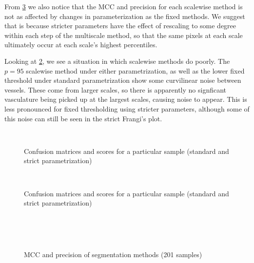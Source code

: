 From \cref{fig:scoring-boxplots} we also notice that the MCC and precision for each scalewise method is not as affected by changes in parameterization as the fixed methods. We suggest that is because stricter parameters have the effect of rescaling to some degree within each step of the multiscale method, so that the same pixels at each scale ultimately occur at each scale's highest percentiles.

Looking at \cref{fig:seg-montage-example2}, we see a situation in which scalewise methods do poorly. The $p=95$ scalewise method under either parametrization, as well as the lower fixed threshold under standard parametrization show some curvilinear noise between vessels. These come from larger scales, so there is apparently no signficant vasculature being picked up at the largest scales, causing noise to appear. This is less pronounced for fixed thresholding using stricter parameters, although some of this noise can still be seen in the strict Frangi's \Vmax plot.




\begin{figure}[p] \centering
   \\
  \caption{Confusion matrices and scores for a particular sample (standard and strict parametrization)}
	\label{fig:seg-montage-example}
\end{figure}

\begin{figure}[p] \centering
	 \\[-0.5cm]
	\caption{Confusion matrices and scores for a particular sample (standard and strict parametrization)}
	\label{fig:seg-montage-example2}
\end{figure}

\begin{figure}[p] \centering
   \\
   \\
   \\
      \caption{MCC and precision of segmentation methods (201 samples)}
      \label{fig:scoring-boxplots}
\end{figure}

